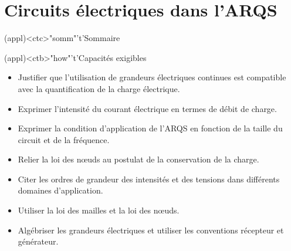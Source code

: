 \documentclass[../../main/main.tex]{subfiles}
\begin{document}
\setcounter{chapter}{0}


\chapter{Circuits électriques dans l'ARQS}

\vspace*{\fill}

\begin{tcn}(appl)<ctc>"somm"'t'{Sommaire}
	\let\item\olditem
	\vspace{-15pt}
	\minitoc
	\vspace{-25pt}
\end{tcn}

\begin{tcn}[sidebyside](appl)<ctb>"how"'t'{Capacités exigibles}
	\begin{itemize}[label=\rcheck]
		\item Justifier que l’utilisation de grandeurs électriques
		      continues est compatible avec la quantification de la charge
		      électrique.
		\item Exprimer l'intensité du courant électrique en termes de débit de
		      charge.
		\item Exprimer la condition d’application de l'ARQS en fonction de la
		      taille du circuit et de la fréquence.
	\end{itemize}
	\tcblower
	\begin{itemize}[label=\rcheck]
		\item Relier la loi des nœuds au postulat de la conservation de la charge.
		\item Citer les ordres de grandeur des intensités et des tensions dans
		      différents domaines d’application.
		\item Utiliser la loi des mailles et la loi des nœuds.
		\item Algébriser les grandeurs électriques et utiliser les conventions
		      récepteur et générateur.
	\end{itemize}
\end{tcn}

\vspace*{\fill}
\newpage
\vspace*{\fill}
\end{document}
